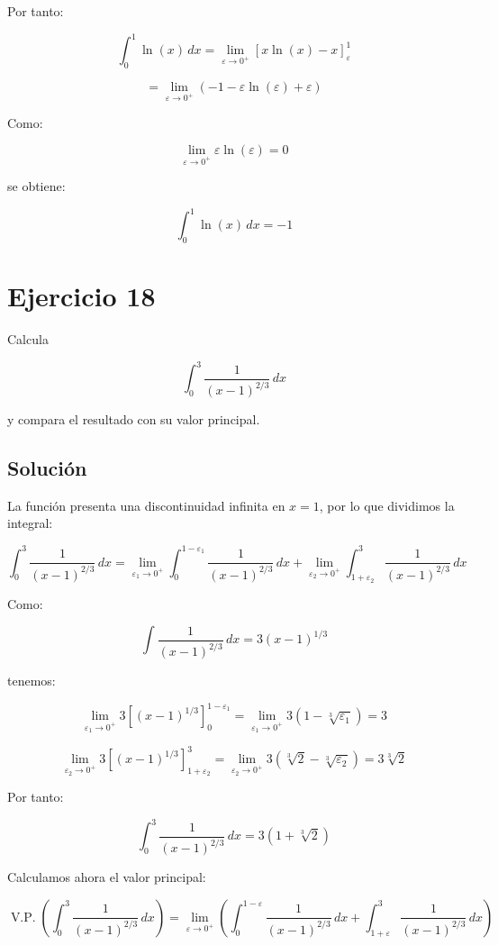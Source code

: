 \documentclass[fleqn]{article}
\begin{document}
	Por tanto:

	\[
	\int_0^1\ln(x)\,dx
	=
	\lim_{\varepsilon\to0^+}
	\left[
	x\ln(x)-x
	\right]_{\varepsilon}^1
	\]

	\[
	=
	\lim_{\varepsilon\to0^+}
	\left(
	-1-\varepsilon\ln(\varepsilon)+\varepsilon
	\right)
	\]

	Como:

	\[
	\lim_{\varepsilon\to0^+}
	\varepsilon\ln(\varepsilon)=0
	\]

	se obtiene:

	\[
	\boxed{
	\int_0^1\ln(x)\,dx=-1
	}
	\]

\section{Ejercicio 18}
	Calcula

	\[
	\int_0^3\frac{1}{(x-1)^{2/3}}\,dx
	\]

	y compara el resultado con su valor principal.

	\subsection{Solución}

	La función presenta una discontinuidad infinita en $x=1$, por lo que dividimos la integral:

	\[
	\int_0^3\frac{1}{(x-1)^{2/3}}\,dx
	=
	\lim_{\varepsilon_1\to0^+}
	\int_0^{1-\varepsilon_1}\frac{1}{(x-1)^{2/3}}\,dx
	+
	\lim_{\varepsilon_2\to0^+}
	\int_{1+\varepsilon_2}^3\frac{1}{(x-1)^{2/3}}\,dx
	\]

	Como:

	\[
	\int\frac{1}{(x-1)^{2/3}}\,dx
	=
	3(x-1)^{1/3}
	\]

	tenemos:

	\[
	\lim_{\varepsilon_1\to0^+}
	3\left[(x-1)^{1/3}\right]_0^{1-\varepsilon_1}
	=
	\lim_{\varepsilon_1\to0^+}
	3\left(1-\sqrt[3]{\varepsilon_1}\right)
	=
	3
	\]

	\[
	\lim_{\varepsilon_2\to0^+}
	3\left[(x-1)^{1/3}\right]_{1+\varepsilon_2}^3
	=
	\lim_{\varepsilon_2\to0^+}
	3\left(\sqrt[3]{2}-\sqrt[3]{\varepsilon_2}\right)
	=
	3\sqrt[3]{2}
	\]

	Por tanto:

	\[
	\boxed{
	\int_0^3\frac{1}{(x-1)^{2/3}}\,dx
	=
	3\left(1+\sqrt[3]{2}\right)
	}
	\]

	Calculamos ahora el valor principal:

	\[
	\operatorname{V.P.}
	\left(
	\int_0^3\frac{1}{(x-1)^{2/3}}\,dx
	\right)
	=
	\lim_{\varepsilon\to0^+}
	\left(
	\int_0^{1-\varepsilon}\frac{1}{(x-1)^{2/3}}\,dx
	+
	\int_{1+\varepsilon}^3\frac{1}{(x-1)^{2/3}}\,dx
	\right)
	\]
\end{document}
